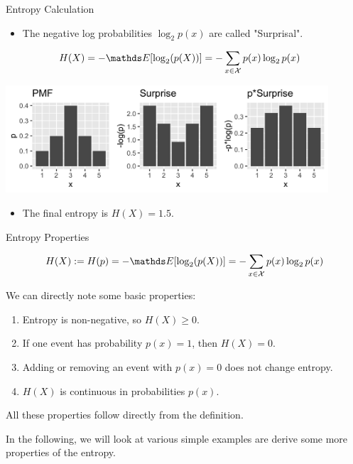\documentclass[11pt,compress,t,notes=noshow, xcolor=table]{beamer}
\begin{document}
\begin{vbframe}{Entropy Calculation}

  \begin{itemize}
  \item The negative log probabilities $\log_2 p(x)$ are called "Surprisal".
  \end{itemize}

\begin{equation*}
\begin{aligned} 
  H(X) = - \E[\log_2(p(X))]           &= -\sum_{x \in \Xspace} p(x) \log_2 p(x) 
\end{aligned} 
\end{equation*}

\begin{center}
\includegraphics[width = 12cm ]{figure/entropy_calc.png} \\
\end{center}

  \begin{itemize}
  \item The final entropy is $H(X)=1.5$.
  \end{itemize}

\end{vbframe}

\begin{vbframe}{Entropy Properties}

$$H(X) := H(p) = - \E[\log_2(p(X))] = -\sum_{x \in \Xspace} p(x) \log_2 p(x)$$

We can directly note some basic properties:
\vspace{0.2cm}
  \begin{enumerate}
  \setlength\itemsep{1.2em} 
    \item Entropy is non-negative, so $H(X) \geq 0$.
    \item If one event has probability $p(x) = 1$, then $H(X)=0$. 
    \item Adding or removing an event with $p(x)=0$ does not change entropy.
    \item $H(X)$ is continuous in probabilities $p(x)$.
  \end{enumerate}
  \lz
All these properties follow directly from the definition.

\vspace{0.4cm}

In the following, we will look at various simple examples are derive some more properties of the entropy.

\end{vbframe}
\end{document}

